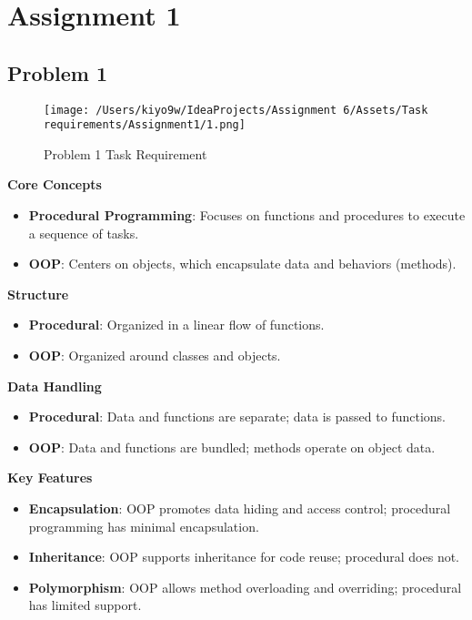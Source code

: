 \documentclass{article}
\begin{document}
\section*{Assignment 1}

\subsection*{Problem 1}

\begin{figure}[H]
    \centering
    \texttt{[image: /Users/kiyo9w/IdeaProjects/Assignment 6/Assets/Task requirements/Assignment1/1.png]}
    \caption{Problem 1 Task Requirement}
\end{figure}

\textbf{Core Concepts}
\begin{itemize}
    \item \textbf{Procedural Programming}: Focuses on functions and procedures to execute a sequence of tasks.
    \item \textbf{OOP}: Centers on objects, which encapsulate data and behaviors (methods).
\end{itemize}

\textbf{Structure}
\begin{itemize}
    \item \textbf{Procedural}: Organized in a linear flow of functions.
    \item \textbf{OOP}: Organized around classes and objects.
\end{itemize}

\textbf{Data Handling}
\begin{itemize}
    \item \textbf{Procedural}: Data and functions are separate; data is passed to functions.
    \item \textbf{OOP}: Data and functions are bundled; methods operate on object data.
\end{itemize}

\textbf{Key Features}
\begin{itemize}
    \item \textbf{Encapsulation}: OOP promotes data hiding and access control; procedural programming has minimal encapsulation.
    \item \textbf{Inheritance}: OOP supports inheritance for code reuse; procedural does not.
    \item \textbf{Polymorphism}: OOP allows method overloading and overriding; procedural has limited support.
\end{itemize}
\end{document}
